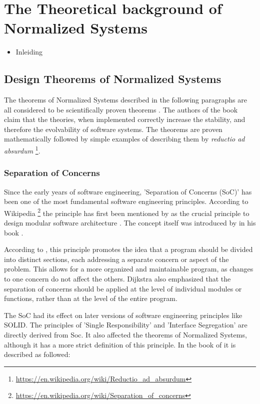\section{The Theoretical background of Normalized Systems} 
\label{ns_theory}
\begin{itemize}
    \item Inleiding
\end{itemize}


\subsection{Design Theorems of Normalized Systems} \label{subsec:ns_desing_theorems}

The theorems of Normalized Systems described in the following paragraphs are all
considered to be scientifically proven theorems \parencite{mannaert_normalized_2016}. The
authors of the book claim that the theories, when implemented correctly increase
the stability, and therefore the evolvability of software systems. The theorems are proven
mathematically followed by simple examples of describing them by \textit{reductio ad absurdum} 
\footnote{\url{https://en.wikipedia.org/wiki/Reductio_ad_absurdum}}.

\subsubsection{Separation of Concerns}
Since the early years of software engineering, 'Separation of Concerns (SoC)' has been one
of the most fundamental software engineering principles. According to Wikipedia
\footnote{\url{https://en.wikipedia.org/wiki/Separation_of_concerns}} the principle has
first been mentioned by \citeauthor{dijkstra_selected_1982} as the crucial principle to
design modular software architecture \parencite[]{dijkstra_selected_1982}. The concept
itself was introduced by \citeauthor{parnas_criteria_1972} in his book
.

According to \citeauthor{dijkstra_selected_1982}, this principle promotes the idea that a
program should be divided into distinct sections, each addressing a separate concern or
aspect of the problem. This allows for a more organized and maintainable program, as
changes to one concern do not affect the others. Dijkstra also emphasized that the
separation of concerns should be applied at the level of individual modules or functions,
rather than at the level of the entire program.

The SoC had its effect on later versions of software engineering principles like SOLID.
The principles of 'Single Responsibility' and 'Interface Segregation' are directly derived
from Soc. It also affected the theorems of Normalized Systems, although it has a more
strict definition of this principle. In the book of \citeauthor{mannaert_normalized_2016}
it is described as followed: 


